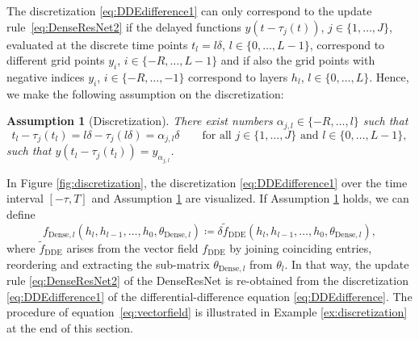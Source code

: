 \documentclass[10pt]{article}
\numberwithin{equation}{section}
\newtheorem{assumption}[theorem]{Assumption}
\begin{document}
	The discretization \eqref{eq:DDEdifference1} can only correspond to the update rule~\eqref{eq:DenseResNet2} if the delayed functions $y(t-\tau_j(t))$, $j \in \{1,\ldots,J\}$, evaluated at the discrete time points $t_l = l \delta$, $l\in\{0,\ldots,L-1\}$, correspond to different grid points $y_i$, $i\in\{-R,\ldots,L-1\}$ and if also the grid points with negative indices $y_i$, $i \in \{-R,\ldots,-1\}$ correspond to layers $h_l$, $l \in \{0,\ldots,L\}$. Hence, we make the following assumption on the discretization:
	\begin{assumption}[Discretization]\label{ass:discretization}
		There exist numbers $\alpha_{j,l} \in \{-R,\ldots,l\}$ such that 
		\begin{equation*}
			t_l - \tau_j(t_l) = l\delta-\tau_j(l \delta) = \alpha_{j,l}\delta  \qquad \text{for all } j \in \{1,\ldots,J\} \text{ and } l \in \{0,\ldots,L-1\},
		\end{equation*}
		such that $y(t_l - \tau_j(t_l)) = y_{\alpha_{j,l}}$. 
	\end{assumption}
	In Figure \ref{fig:discretization}, the discretization \eqref{eq:DDEdifference1} over the time interval $[-\tau,T]$ and  Assumption \ref{ass:discretization} are visualized. If Assumption \ref{ass:discretization} holds, we can define 
	\begin{equation} \label{eq:vectorfield}
		f_{\text{Dense},l}(h_l,h_{l-1},\ldots,h_0,\theta_{\text{Dense},l}) \coloneqq \delta \tilde{f}_\text{DDE}(h_l,h_{l-1},\ldots,h_0,\theta_{\text{Dense},l}),
	\end{equation}
	where $\tilde{f}_\text{DDE}$ arises from the vector field $f_\text{DDE}$ by joining coinciding entries, reordering and extracting the sub-matrix $\theta_{\text{Dense},l}$ from $\theta_l$. In that way, the update rule \eqref{eq:DenseResNet2} of the DenseResNet is re-obtained from the discretization \eqref{eq:DDEdifference1} of the differential-difference equation \eqref{eq:DDEdifference}. The procedure of equation~\eqref{eq:vectorfield} is illustrated in Example \ref{ex:discretization} at the end of this section. 
	
\end{document}

